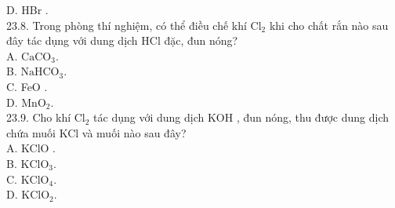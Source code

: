 \documentclass[10pt]{article}
\begin{document}
D. HBr .\\
23.8. Trong phòng thí nghiệm, có thể điều chế khí $\mathrm{Cl}_{2}$ khi cho chất rắn nào sau đây tác dụng với dung dịch HCl đặc, đun nóng?\\
A. $\mathrm{CaCO}_{3}$.\\
B. $\mathrm{NaHCO}_{3}$.\\
C. FeO .\\
D. $\mathrm{MnO}_{2}$.\\
23.9. Cho khí $\mathrm{Cl}_{2}$ tác dụng với dung dịch KOH , đun nóng, thu được dung dịch chứa muối KCl và muối nào sau đây?\\
A. KClO .\\
B. $\mathrm{KClO}_{3}$.\\
C. $\mathrm{KClO}_{4}$.\\
D. $\mathrm{KClO}_{2}$.
\end{document}
